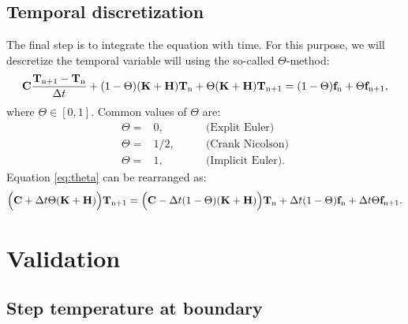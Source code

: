 \documentclass[10pt, a4paper, twoside, headinclude,footinclude, BCOR5mm]{scrartcl}
\begin{document}
\subsection{Temporal discretization}
\label{sec:org7facc3b}

The final step is to integrate the equation with time. For this purpose, we will descretize the temporal variable will using the so-called \(\Theta\)-method:
\begin{equation}
\label{eq:theta}
  \bold{C} \frac{\bold{T}_{\text{n}+1} - \bold{T}_\text{n}}{\Delta t} +
  (1-\Theta)(\bold{K}+\bold{H}) \bold{T}_{\text{n}} +
  \Theta(\bold{K}+\bold{H}) \bold{T}_{\text{n}+1}
  =
  (1-\Theta)\bold{f}_{\text{n}} + \Theta\bold{f}_{\text{n}+1},
\end{equation}
where \(\Theta \in [0, 1]\). Common values of \(\Theta\) are:
\begin{eqnarray*}
  \Theta =& 0,   &\qquad\text{(Explit Euler)}\\
  \Theta =& 1/2, &\qquad\text{(Crank Nicolson)}\\
  \Theta =& 1,   &\qquad\text{(Implicit Euler)}.
\end{eqnarray*}
Equation \ref{eq:theta} can be rearranged as:
\begin{equation*}
  \Bigl( \bold{C} + \Delta t\Theta(\bold{K}+\bold{H})
  \Bigr) \bold{T}_{\text{n}+1} =
  \Bigl(
  \bold{C} - \Delta t(1-\Theta)(\bold{K}+\bold{H})
  \Bigr) \bold{T}_{\text{n}} +
  \Delta t(1-\Theta)\bold{f}_{\text{n}} +
  \Delta t\Theta\bold{f}_{\text{n}+1}.
\end{equation*}


\section{Validation}
\label{sec:org032e414}

\subsection{Step temperature at boundary}
\label{sec:org394f742}
\end{document}
